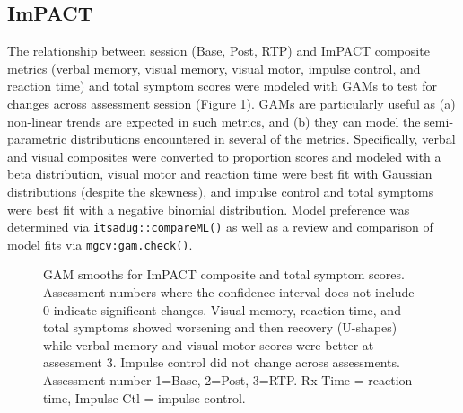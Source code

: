 \documentclass[12pt]{article}
\begin{document}
\subsection{ImPACT}
\label{ssec:res-imp}
The relationship between session (Base, Post, RTP) and ImPACT composite metrics (verbal memory, visual memory, visual motor, impulse control, and reaction time) and total symptom scores were modeled with GAMs to test for changes across assessment session (Figure \ref{fig:imp-gam}). GAMs are particularly useful as (a) non-linear trends are expected in such metrics, and (b) they can model the semi-parametric distributions encountered in several of the metrics. Specifically, verbal and visual composites were converted to proportion scores and modeled with a beta distribution, visual motor and reaction time were best fit with Gaussian distributions (despite the skewness), and impulse control and total symptoms were best fit with a negative binomial distribution. Model preference was determined via \lstinline{itsadug::compareML()} as well as a review and comparison of model fits via \lstinline{mgcv:gam.check()}.

\begin{figure}[H]
	\centering
	\caption{GAM smooths for ImPACT composite and total symptom scores. Assessment numbers where the confidence interval does not include 0 indicate significant changes. Visual memory, reaction time, and total symptoms showed worsening and then recovery (U-shapes) while verbal memory and visual motor scores were better at assessment 3. Impulse control did not change across assessments. Assessment number 1=Base, 2=Post, 3=RTP. Rx Time = reaction time, Impulse Ctl = impulse control.}
	\label{fig:imp-gam}
\end{figure}
\end{document}
